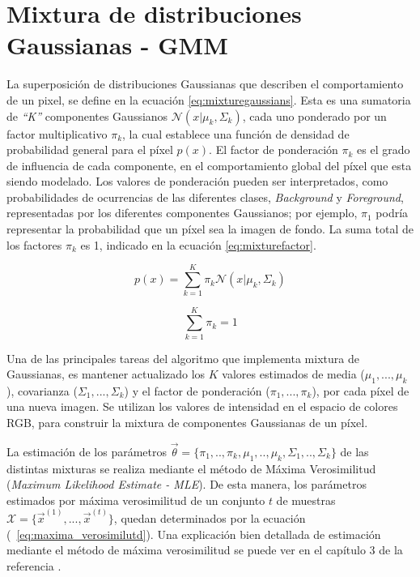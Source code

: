 \section{Mixtura de distribuciones Gaussianas - GMM}


La superposición de distribuciones Gaussianas que describen el comportamiento de un pixel, se define en la ecuación \eqref{eq:mixturegaussians}. Esta es una sumatoria de \textit{``K''} componentes Gaussianos $\mathcal{N}( x | \mu_k , \Sigma_k)$, cada uno ponderado por un factor multiplicativo $\pi_k$, la cual establece una función de densidad de probabilidad general para el píxel $p(x)$. El factor de ponderación $\pi_k$ es el grado de influencia de cada componente, en el comportamiento global del píxel que esta siendo modelado. Los valores de ponderación pueden ser interpretados, como probabilidades de ocurrencias de las diferentes clases, \textit{Background} y \textit{Foreground}, representadas por los diferentes componentes Gaussianos; por ejemplo, $\pi_1$ podría representar la probabilidad que un píxel sea la imagen de fondo. La suma total de los factores $\pi_k$ es 1, indicado en la ecuación \eqref{eq:mixturefactor}. 

\begin{equation} \label{eq:mixturegaussians}
p(x) = \sum_{k=1}^{K} \pi_k \mathcal{N}( x | \mu_k , \Sigma_k)
\end{equation}

\begin{equation} \label{eq:mixturefactor}
\sum_{k=1}^{K} \pi_k = 1
\end{equation}


Una de las principales tareas del algoritmo que implementa mixtura de Gaussianas, es mantener actualizado los $K$ valores estimados de media ($\mu_1, ..., \mu_k$),  covarianza ($\Sigma_1, ..., \Sigma_k$) y el factor de ponderación ($\pi_1, ..., \pi_k$), por cada píxel de una nueva imagen. Se utilizan los valores de intensidad en el espacio de colores RGB, para construir la mixtura de componentes Gaussianas de un píxel.

La estimación de los parámetros $\vec{\theta} = \{\pi_1,..,\pi_k, \mu_1,..,\mu_k,\Sigma_1,..,\Sigma_k \} $ de las distintas mixturas se realiza mediante el método de Máxima Verosimilitud (\textit{Maximum Likelihood Estimate - MLE}). De esta manera, los parámetros estimados por máxima verosimilitud de un conjunto $t$ de muestras $\mathcal{X} = \{\vec{x}^{(1)}, ..., \vec{x}^{(t)}\}$, quedan determinados por la ecuación (~\ref{eq:maxima_verosimilutd}). Una explicación bien detallada de estimación mediante el método de máxima verosimilitud se puede ver en el capítulo 3 de la referencia \cite{duda_pattern_2000}.

